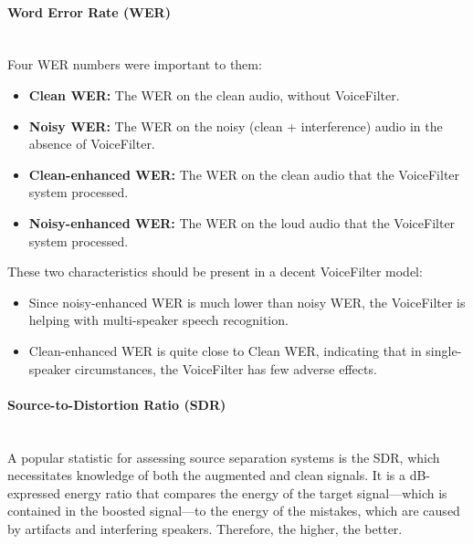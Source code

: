 \paragraph{Word Error Rate (WER)}\mbox{}\\
Four WER numbers were important to them:
\begin{itemize}
    \item \textbf{Clean WER:} The WER on the clean audio, without VoiceFilter.
    \item \textbf{Noisy WER:} The WER on the noisy (clean + interference) audio in the absence of VoiceFilter.
    \item \textbf{Clean-enhanced WER:} The WER on the clean audio that the VoiceFilter system processed.
    \item \textbf{Noisy-enhanced WER:} The WER on the loud audio that the VoiceFilter system processed.
\end{itemize}
These two characteristics should be present in a decent VoiceFilter model:
\begin{itemize}
    \item Since noisy-enhanced WER is much lower than noisy WER, the VoiceFilter is helping with multi-speaker speech recognition.
    \item Clean-enhanced WER is quite close to Clean WER, indicating that in single-speaker circumstances, the VoiceFilter has few adverse effects.
\end{itemize}

\paragraph{Source-to-Distortion Ratio (SDR)}\mbox{}\\
A popular statistic for assessing source separation systems is the SDR, which necessitates knowledge of both the augmented and clean signals. It is a dB-expressed energy ratio that compares the energy of the target signal—which is contained in the boosted signal—to the energy of the mistakes, which are caused by artifacts and interfering speakers. Therefore, the higher, the better.